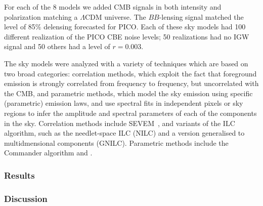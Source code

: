\documentclass[PICOReport.tex]{subfiles}
\begin{document}
For each of the 8 models we added CMB signals in both intensity and polarization matching a $\Lambda$CDM universe. The $BB$-lensing signal matched the level of 85\% delensing forecasted for PICO. Each of these sky models had 100 different realization of the PICO CBE noise levels; 50 realizations had no \ac{IGW} signal and 50 others had a level of $r=0.003$. 

\vspace{0.1in}
 \hspace{0.1in} The sky models were analyzed with a variety of techniques which are based on two broad categories: correlation methods, which exploit the fact that foreground emission is strongly correlated from frequency to frequency, but uncorrelated with the CMB, and parametric methods, which model the sky emission using specific (parametric) emission laws, and use spectral fits in independent pixels or sky regions to infer the amplitude and spectral parameters of each of the components in the sky. Correlation methods include SEVEM~\citep{sevem}, and variants of the \ac{ILC} algorithm, such as the needlet-space \ac{ILC} (NILC) and a version generalised to multidmensional components (GNILC). Parametric methods include the Commander algorithm and .

\subsubsection{Results}

\subsubsection{Discussion}
\end{document}

